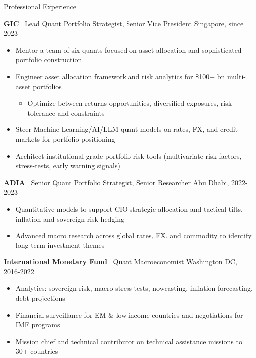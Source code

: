 \documentclass[usegeometry, 10pt, a4paper]{cv} %
\newcommand{\activite}[1]{\textbf{#1}\ }
\begin{document}
\begin{rubriquetableau}[0.95\textwidth]{Professional Experience}\\
\vspace{-0.5cm}

\activite{GIC} Lead Quant Portfolio Strategist, Senior Vice President \hfill
Singapore, since 2023 \\ \vspace{-0.4cm}
\begin{itemize}
  \item Mentor a team of six quants focused on asset allocation and sophisticated portfolio construction
  \item Engineer asset allocation framework and risk analytics for \$100+ bn multi-asset portfolios
  \begin{itemize}
  \item Optimize between returns opportunities, diversified exposures, risk tolerance and constraints
  \end{itemize} 
  \item Steer Machine Learning/AI/LLM quant models on rates, FX, and credit markets for portfolio positioning
  \item Architect institutional-grade portfolio risk tools (multivariate risk factors, stress-tests, early warning signals) 
\end{itemize} 

\vspace{0.4cm}

\activite{ADIA} Senior Quant Portfolio Strategist, Senior Researcher  \hfill
Abu Dhabi, 2022-2023 \\ \vspace{-0.2cm}
\begin{itemize}[]
\item Quantitative models to support CIO strategic allocation and tactical tilts, inflation and sovereign risk hedging
\item Advanced macro research across global rates, FX, and commodity to identify long-term investment themes
 \end{itemize}
 
\vspace{0.4cm}

\activite{International Monetary Fund} Quant Macroeconomist \hfill Washington DC, 2016-2022 \\
\vspace{-0.2cm}

\begin{itemize}[]
  \item Analytics: sovereign risk, macro stress-tests, nowcasting, inflation forecasting, debt projections
  \item Financial surveillance for EM \& low-income countries and negotiations for IMF programs 
  \item Mission chief and technical contributor on technical assistance missions to 30+ countries 
  \end{itemize}  
\vspace{0.4cm}


\end{rubriquetableau}
\end{document}
